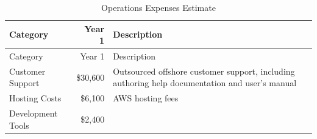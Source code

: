 \documentclass[11pt,openany]{book}
\begin{document}
\begin{longtable}[]{@{}lrl@{}}
\caption{Operations Expenses Estimate}\tabularnewline
\toprule
\begin{minipage}[b]{0.31\columnwidth}\raggedright
Category\strut
\end{minipage} & \begin{minipage}[b]{0.12\columnwidth}\raggedleft
Year 1\strut
\end{minipage} & \begin{minipage}[b]{0.48\columnwidth}\raggedright
Description\strut
\end{minipage}\tabularnewline
\midrule
\endfirsthead
\toprule
\begin{minipage}[b]{0.31\columnwidth}\raggedright
Category\strut
\end{minipage} & \begin{minipage}[b]{0.12\columnwidth}\raggedleft
Year 1\strut
\end{minipage} & \begin{minipage}[b]{0.48\columnwidth}\raggedright
Description\strut
\end{minipage}\tabularnewline
\midrule
\endhead
\begin{minipage}[t]{0.31\columnwidth}\raggedright
Customer Support\strut
\end{minipage} & \begin{minipage}[t]{0.12\columnwidth}\raggedleft
\$30,600\strut
\end{minipage} & \begin{minipage}[t]{0.48\columnwidth}\raggedright
Outsourced offshore customer support, including authoring help
documentation and user's manual\strut
\end{minipage}\tabularnewline
\begin{minipage}[t]{0.31\columnwidth}\raggedright
Hosting Costs\strut
\end{minipage} & \begin{minipage}[t]{0.12\columnwidth}\raggedleft
\$6,100\strut
\end{minipage} & \begin{minipage}[t]{0.48\columnwidth}\raggedright
AWS hosting fees\strut
\end{minipage}\tabularnewline
\begin{minipage}[t]{0.31\columnwidth}\raggedright
Development Tools\strut
\end{minipage} & \begin{minipage}[t]{0.12\columnwidth}\raggedleft
\$2,400\strut
\end{minipage} & \begin{minipage}[t]{0.48\columnwidth}\raggedright

\end{minipage}
\end{longtable}
\end{document}
